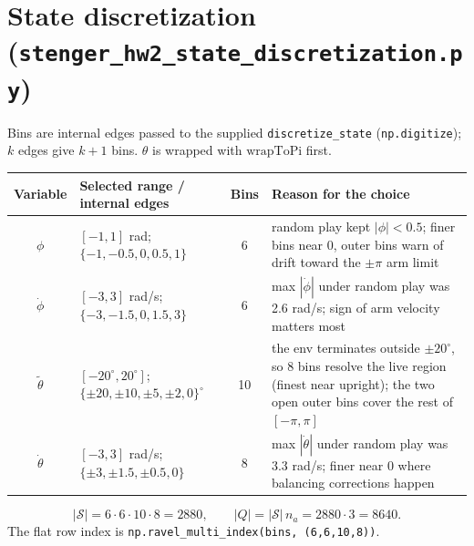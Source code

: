 \documentclass[11pt]{article}
\newcommand{\thw}{\tilde\theta}
\begin{document}
\section{State discretization (\texttt{stenger\_hw2\_state\_discretization.py})}

Bins are internal edges passed to the supplied \texttt{discretize\_state}
(\texttt{np.digitize}); $k$ edges give $k+1$ bins. $\theta$ is wrapped with
$\mathrm{wrapToPi}$ first.

\begin{center}
\small
\begin{tabular}{cp{4.3cm}cp{6.4cm}}\toprule
Variable & Selected range / internal edges & Bins & Reason for the choice\\\midrule
$\phi$ & $[-1,1]$ rad; $\{-1,-0.5,0,0.5,1\}$ & 6 &
random play kept $|\phi|<0.5$; finer bins near 0, outer bins warn of drift toward the $\pm\pi$ arm limit\\
$\dot\phi$ & $[-3,3]$ rad/s; $\{-3,-1.5,0,1.5,3\}$ & 6 &
max $|\dot\phi|$ under random play was 2.6 rad/s; sign of arm velocity matters most\\
$\thw$ & $[-20^\circ,20^\circ]$; $\{\pm20,\pm10,\pm5,\pm2,0\}^\circ$ & 10 &
the env terminates outside $\pm20^\circ$, so 8 bins resolve the live region (finest near upright); the two open outer bins cover the rest of $[-\pi,\pi]$\\
$\dot\theta$ & $[-3,3]$ rad/s; $\{\pm3,\pm1.5,\pm0.5,0\}$ & 8 &
max $|\dot\theta|$ under random play was 3.3 rad/s; finer near 0 where balancing corrections happen\\\bottomrule
\end{tabular}
\end{center}

\[
|\mathcal S| = 6\cdot6\cdot10\cdot8 = 2880,\qquad |Q|=|\mathcal S|\,n_a=2880\cdot3=8640 .
\]
The flat row index is \texttt{np.ravel\_multi\_index(bins, (6,6,10,8))}.
\end{document}
